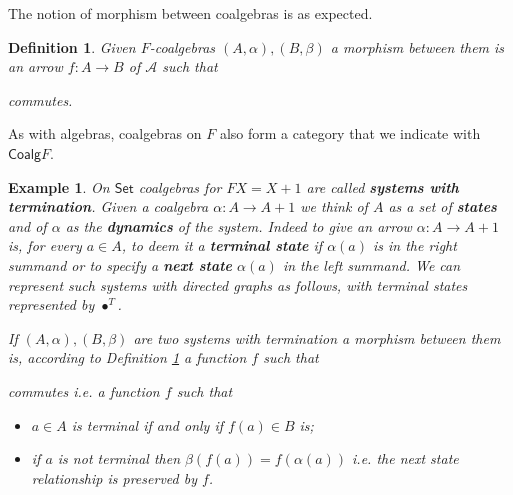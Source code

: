 \documentclass[letterpaper, 11pt, oneside]{memoir}
\theoremstyle{myteo}
\newtheorem{definition}[theorem]{Definition}
\newtheorem{example}[theorem]{Example}
\numberwithin{equation}{section}
\newcommand{\marginnote}[1]{\marginpar{\footnotesize #1}}
\newcommand{\id}{\textsf{id}}
\newcommand{\Coalg}{\textsf{Coalg}}
\newcommand{\Set}{\textsf{Set}}
\newcommand{\A}{\mathscr{A}}
\begin{document}
The notion of morphism between coalgebras is as expected.

\begin{definition}
  \label{def:coalgebra-morphism}
  Given \(F\)-coalgebras \((A, \alpha), (B, \beta)\) a morphism between them is an arrow \(f : A \to B\) of \(\A\) such that
  \begin{center}
  \end{center}
  commutes.
\end{definition}

As with algebras, coalgebras on \(F\) also form a category that we indicate with \(\Coalg F\).

\begin{example}
  \label{ex:systems-with-termination}
  On \(\Set\) coalgebras for \(FX = X + 1\) are called \textbf{systems with termination}\marginnote{systems with termination}.
  Given a coalgebra \(\alpha: A \to A + 1\) we think of \(A\) as a set of \textbf{states} and of \(\alpha\) as the \textbf{dynamics} of the system.
  Indeed to give an arrow \(\alpha:A \to A+1\) is, for every \(a \in A\), to deem it a \textbf{terminal state} if \(\alpha(a)\) is in the right summand or to specify a \textbf{next state} \(\alpha(a)\) in the left summand.
  We can represent such systems with directed graphs as follows, with terminal states represented by \(\bullet^T\).
  \begin{center}
  \end{center}
  If \((A, \alpha), (B, \beta)\) are two systems with termination a morphism between them is, according to Definition \ref{def:coalgebra-morphism} a function \(f\) such that
  \begin{center}
  \end{center}
  commutes i.e. a function \(f\) such that
  \begin{itemize}
  \item[1.] \(a \in A\) is terminal if and only if \(f(a) \in B\) is;
  \item[2.] if \(a\) is not terminal then \(\beta(f(a)) = f(\alpha(a))\) i.e. the next state relationship is preserved by \(f\).
  \end{itemize}
\end{example}
\end{document}
